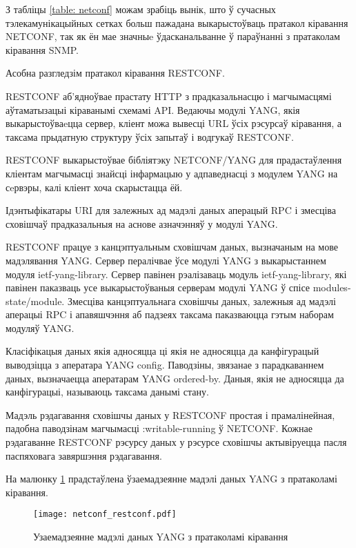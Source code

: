 З табліцы \ref{table: netconf} можам зрабіць вынік, што ў сучасных тэлекамунікацыйных сетках
больш пажадана выкарыстоўваць пратакол кіравання NETCONF, так як ён мае значныe ўдасканальванне
ў параўнанні з пратаколам кіравання SNMP.

Асобна разгледзім пратакол кіравання RESTCONF.

RESTCONF аб'ядноўвае прастату HTTP з прадказальнасцю і магчымасцямі аўтаматызацыі кіраванымі схемамі API. Ведаючы модулі YANG, якія выкарыстоўваeцца сервер, кліент можа вывесці URL ўсіх рэсурсаў кіравання, а таксама прыдатную структуру ўсіх запытаў і водгукаў RESTCONF.

RESTCONF выкарыстоўвае бібліятэку NETCONF/YANG для прадастаўлення кліентам магчымасці знайсці інфармацыю у адпаведнасці з модулем YANG на сeрвэры, калі кліент хоча скарыстацца ёй.

Ідэнтыфікатары URI для залежных ад мадэлі даных аперацый RPC і змесціва сховішчаў прадказальныя на аснове азначэнняў у модулі YANG.

RESTCONF працуе з канцэптуальным сховішчам даных, вызначаным на мове мадэлявання YANG. Сервер пералічвае ўсе модулі YANG з выкарыстаннем модуля ietf-yang-library. Сервер павінен рэалізаваць модуль ietf-yang-library, які павінен паказваць усе выкарыстоўваныя серверам модулі YANG ў спісе modules-state/module. Змесціва канцэптуальнага сховішчы даных, залежныя ад мадэлі аперацыі RPC і апавяшчэння аб падзеях таксама паказваюцца гэтым наборам модуляў YANG.

Класіфікацыя даных якія адносяцца ці якія не адносяцца да канфігурацый выводзіцца з аператара YANG config. Паводзіны, звязанае з парадкаваннем даных, вызначаецца аператарам YANG ordered-by. Даныя, якія не адносяцца да канфігурацыі, называюць таксама данымі стану.

Мадэль рэдагавання сховішчы даных у RESTCONF простая і прамалінейная, падобна паводзінам магчымасці :writable-running ў NETCONF. Кожнае рэдагаванне RESTCONF рэсурсу даных у рэсурсе сховішчы актывіруецца пасля паспяховага завяршэння рэдагавання.

На малюнку \ref{img: netconf-restconf} прадстаўлена ўзаемадзеянне мадэлі даных YANG з пратаколамі кіравання.

\begin{figure}[ht!]
    \centering
    \texttt{[image: netconf\_restconf.pdf]}
    \caption{Узаемадзеянне мадэлі даных YANG з пратаколамі кіравання}
    \label{img: netconf-restconf}
\end{figure}

